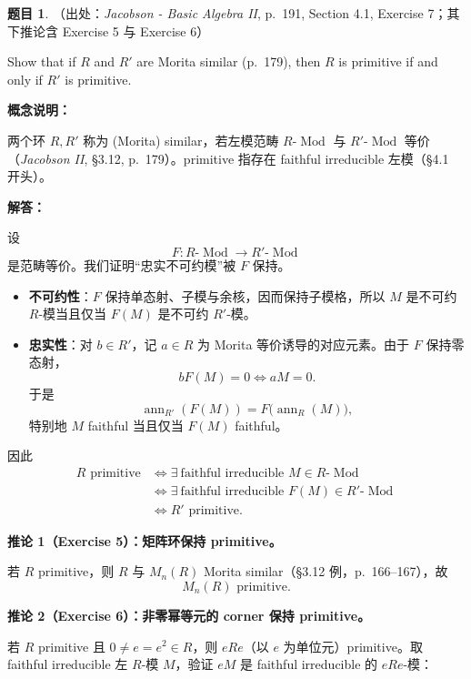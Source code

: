 \documentclass[a4paper]{ctexart}
\theoremstyle{definition}
\newtheorem{example}{题目}[section]
\theoremstyle{analysis}
\theoremstyle{plain}
\begin{document}
\begin{example}
（出处：\textit{Jacobson - Basic Algebra II}, p.~191, Section 4.1, Exercise 7；其下推论含 Exercise 5 与 Exercise 6）

Show that if \(R\) and \(R'\) are Morita similar (p.~179), then \(R\) is primitive if and only if \(R'\) is primitive.

\textbf{概念说明：}

两个环 \(R,R'\) 称为 (Morita) similar，若左模范畴 \(R\text{-}\operatorname{Mod}\) 与 \(R'\text{-}\operatorname{Mod}\) 等价（\textit{Jacobson II}, \S 3.12, p.~179）。primitive 指存在 faithful irreducible 左模（\S 4.1 开头）。

\textbf{解答：}

设
\[
  F:R\text{-}\operatorname{Mod}\longrightarrow R'\text{-}\operatorname{Mod}
\]
是范畴等价。我们证明“忠实不可约模”被 \(F\) 保持。

\begin{itemize}
  \item \textbf{不可约性}：\(F\) 保持单态射、子模与余核，因而保持子模格，所以 \(M\) 是不可约 \(R\)-模当且仅当 \(F(M)\) 是不可约 \(R'\)-模。
  \item \textbf{忠实性}：对 \(b\in R'\)，记 \(a\in R\) 为 Morita 等价诱导的对应元素。由于 \(F\) 保持零态射，
  \[
    bF(M)=0 \iff aM=0.
  \]
  于是
  \[
    \operatorname{ann}_{R'}(F(M))=F\bigl(\operatorname{ann}_R(M)\bigr),
  \]
  特别地 \(M\) faithful 当且仅当 \(F(M)\) faithful。
\end{itemize}

因此
\[
  \begin{aligned}
    R\text{ primitive}
    &\iff \exists\ \text{faithful irreducible }M\in R\text{-}\operatorname{Mod}\\
    &\iff \exists\ \text{faithful irreducible }F(M)\in R'\text{-}\operatorname{Mod}\\
    &\iff R'\text{ primitive}.
  \end{aligned}
\]

\medskip

\textbf{推论 1（Exercise 5）：矩阵环保持 primitive。}

若 \(R\) primitive，则 \(R\) 与 \(M_n(R)\) Morita similar（\S 3.12 例，p.~166--167），故
\[
  M_n(R)\text{ primitive}.
\]

\medskip

\textbf{推论 2（Exercise 6）：非零幂等元的 corner 保持 primitive。}

若 \(R\) primitive 且 \(0\neq e=e^2\in R\)，则 \(eRe\)（以 \(e\) 为单位元）primitive。取 faithful irreducible 左 \(R\)-模 \(M\)，验证 \(eM\) 是 faithful irreducible 的 \(eRe\)-模：


\end{example}
\end{document}
